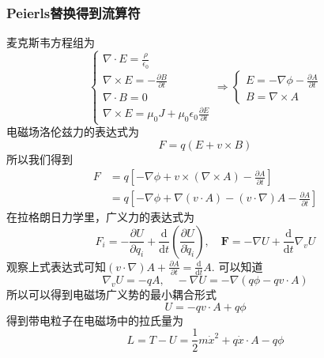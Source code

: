 \documentclass{article}
\numberwithin{equation}{subsection}
\begin{document}
\subsubsection{Peierls替换得到流算符}
麦克斯韦方程组为
\begin{equation}
    \begin{cases}
        \nabla\cdot E=\frac{\rho}{\epsilon_0}\\
        \nabla\times E=-\frac{\partial B}{\partial t}\\
        \nabla\cdot B=0\\
        \nabla\times E=\mu_0J+\mu_0\epsilon_0\frac{\partial E}{\partial t}
    \end{cases}\Longrightarrow\begin{cases}
        E=-\nabla\phi-\frac{\partial A}{\partial t}\\
        B=\nabla\times A
    \end{cases}
\end{equation}
电磁场洛伦兹力的表达式为
\begin{equation}
    F=q(E+v\times B)
\end{equation}
所以我们得到
\begin{equation}
    \begin{split}
        F&=q\left[-\nabla\phi+v\times(\nabla\times A)-\frac{\partial A}{\partial t}\right]\\
        &=q\left[-\nabla\phi+\nabla(v\cdot A)-(v\cdot\nabla)A-\frac{\partial A}{\partial t}\right]
    \end{split}
\end{equation}
在拉格朗日力学里，广义力的表达式为
\begin{equation}
    F_i=-\frac{\partial U}{\partial q_i}+\frac{\mathrm{d}}{\mathrm{d}t}\left(\frac{\partial U}{\partial\dot{q}_i}\right),\quad\mathbf{F}=-\nabla U+\frac{\mathrm{d}}{\mathrm{d}t}\nabla_v U
\end{equation}
观察上式表达式可知$(v\cdot\nabla)A+\frac{\partial A}{\partial t}=\frac{\mathrm{d}}{\mathrm{d}t}A$. 可以知道
\begin{equation}
    \nabla_vU=-qA,\quad-\nabla U=-\nabla(q\phi-qv\cdot A)
\end{equation}
所以可以得到电磁场广义势的最小耦合形式
\begin{equation}
    U=-qv\cdot A+q\phi
\end{equation}
得到带电粒子在电磁场中的拉氏量为
\begin{equation}
    L=T-U=\frac{1}{2}m\dot{x}^2+q\dot{x}\cdot A-q\phi
\end{equation}
\end{document}
